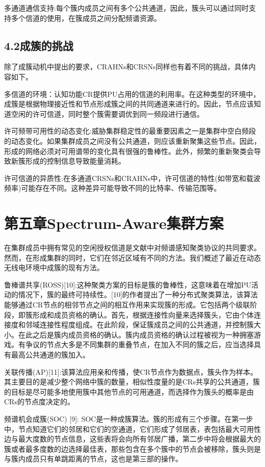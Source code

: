 \documentclass[a4paper,AutoFakeBold,oneside,12pt]{book}
\begin{document}
  多通道通信支持:每个簇内成员之间有多个公共通道，因此，簇头可以通过同时支持多个信道的使用，在簇成员之间分配频谱资源。

\section*{4.2\quad{}成簇的挑战}

  除了成簇动机中提出的要求，CRAHNs和CRSNs同样也有着不同的挑战，具体内容如下。

  多信道的环境：认知功能CR提供PU占用的信道的利用率。在这种类型的环境中，成簇是根据物理接近性和节点形成簇之间的共同通道来进行的。因此，节点应该知道空闲的许可信道，同时整个簇需要调优到同一频段进行通信。

  许可频带可用性的动态变化:威胁集群稳定性的最重要因素之一是集群中空白频段的动态变化。如果集群成员之间没有公共通道，则应该重新聚集这些节点。因此，形成的网络必须对可用谱带的变化具有很强的鲁棒性。此外，频繁的重新聚类会导致新簇形成的控制信息导致能量消耗。

  许可信道的异质性:在多通道CRSNs和CRAHNs中，许可信道的特性(如带宽和载波频率)可能存在不同。这种差异可能导致不同的比特率、传输范围等。

\chapter*{第五章\quad{}Spectrum-Aware集群方案}


  在集群成员中拥有常见的空闲授权信道是文献中对频谱感知聚类协议的共同要求。然而，在形成集群的同时，它们在邻近区域有不同的方法。我们概述了最近在动态无线电环境中成簇的现有方法。

  鲁棒谱共享(ROSS)[10]:这种聚类方案的目标是簇的鲁棒性，这意味着在增加PU活动的情况下，簇的最终可持续性。[10]的作者提出了一种分布式聚类算法，该算法能够通过CR节点的相邻节点之间的相互作用来实现簇的形成。它包括两个级联阶段，即簇形成和成员资格的确认。首先，根据连接性向量来选择簇头，它由个体连接度和邻域连接性程度组成。在此阶段，保证簇成员之间的公共通道，并控制簇大小。在此之后是簇内成员资格的确认。簇内成员资格的确认过程被视为一种拥塞游戏。有争议的节点大多是不同集群的重叠节点，在加入不同的簇之后，应当选择具有最高公共通道的簇加入。

  关联传播(AP)[11]:该算法应用亲和传播，使CR节点作为数据点，簇头作为样本。其主要目的是减少整个网络中簇的数量，相似性度量的是CRs共享的公共通道，簇的目标是尽可能多地使用簇中其他节点的可用通道，而选择作为簇头的概率是由CRs的节点度决定的。

  频谱机会成簇(SOC) [9]: SOC是一种成簇算法。簇的形成有三个步骤。在第一步中，节点知道它们的邻居和它们的空通道，它们形成了邻居表，表包括最大可用性边与最大度数的节点信息，这些表将会向所有邻居广播，第二步中将会根据最大的簇或者最多度数的边选择最佳表，那些包含在多个簇中的节点会被移除，簇头则是与簇内成员只有单跳距离的节点，这也是第三部的操作。
\end{document}
